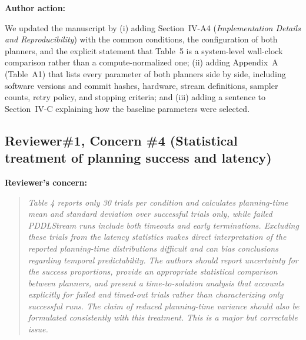 \documentclass[11pt]{article}
\newif\ifshowstatus
\newcommand{\statusline}[2]{\ifshowstatus\par\noindent\textcolor{status#1}{\textbf{Status: \MakeUppercase{#1}.} #2}\par\smallskip\fi}
\newenvironment{concern}[3][pending]{\subsection*{\ifshowstatus\textcolor{status#1}{#2}\else#2\fi}\statusline{#1}{#3}\textbf{Reviewer's concern:}\begin{quote}\itshape}{\end{quote}}
\newenvironment{action}{\textbf{Author action:}\par\smallskip}{\par\bigskip\noindent\hrulefill\par\bigskip}
\begin{document}
\begin{action}
We updated the manuscript by
(i) adding Section~IV-A4 (\emph{Implementation Details and Reproducibility}) with the common conditions, the configuration of both planners, and the explicit statement that Table~5 is a system-level wall-clock comparison rather than a compute-normalized one;
(ii) adding Appendix~A (Table~A1) that lists every parameter of both planners side by side, including software versions and commit hashes, hardware, stream definitions, sampler counts, retry policy, and stopping criteria;
and (iii) adding a sentence to Section~IV-C explaining how the baseline parameters were selected.
\end{action}

\begin{concern}[pending]{Reviewer\#1, Concern \#4 (Statistical treatment of planning success and latency)}{McNemar and restricted-mean values are final; needs B2 (Kaplan--Meier figure and cuTAMP time band from logs). Wording changes can be applied now.}
Table 4 reports only 30 trials per condition and calculates planning-time mean and standard deviation over successful trials only, while failed PDDLStream runs include both timeouts and early terminations.
Excluding these trials from the latency statistics makes direct interpretation of the reported planning-time distributions difficult and can bias conclusions regarding temporal predictability.
The authors should report uncertainty for the success proportions, provide an appropriate statistical comparison between planners, and present a time-to-solution analysis that accounts explicitly for failed and timed-out trials rather than characterizing only successful runs.
The claim of reduced planning-time variance should also be formulated consistently with this treatment.
This is a major but correctable issue.
\end{concern}
\end{document}
